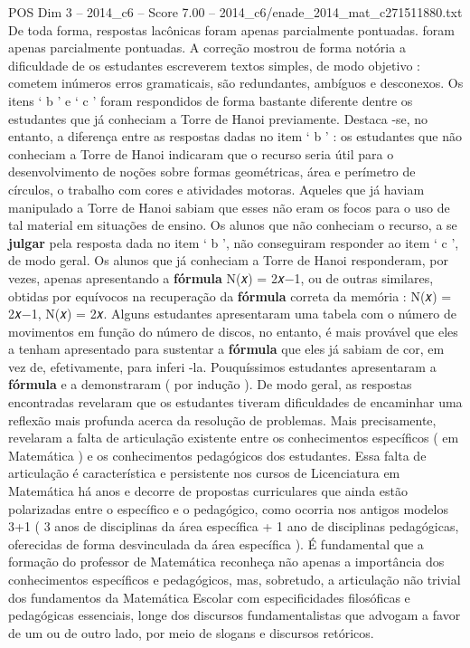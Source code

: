 \begin{textsample}{POS Dim 3 – 2014\_c6 – Score 7.00 – 2014\_c6/enade\_2014\_mat\_c271511880.txt}
De toda forma, respostas lacônicas foram apenas parcialmente pontuadas. foram apenas parcialmente pontuadas.
A correção mostrou de forma notória a dificuldade de os estudantes escreverem textos simples, de modo objetivo : cometem inúmeros erros gramaticais, são redundantes, ambíguos e desconexos.
Os itens ‘ b ’ e ‘ c ’ foram respondidos de forma bastante diferente dentre os estudantes que já conheciam a Torre de Hanoi previamente.
Destaca -se, no entanto, a diferença entre as respostas dadas no item ‘ b ’ : os estudantes que não conheciam a Torre de Hanoi indicaram que o recurso seria útil para o desenvolvimento de noções sobre formas geométricas, área e perímetro de círculos, o trabalho com cores e atividades motoras.
Aqueles que já haviam manipulado a Torre de Hanoi sabiam que esses não eram os focos para o uso de tal material em situações de ensino.
Os alunos que não conheciam o recurso, a se \textbf{julgar} pela resposta dada no item ‘ b ’, não conseguiram responder ao item ‘ c ’, de modo geral.
Os alunos que já conheciam a Torre de Hanoi responderam, por vezes, apenas apresentando a \textbf{fórmula} N(𝑥) = 2𝑥−1, ou de outras similares, obtidas por equívocos na recuperação da \textbf{fórmula} correta da memória : N(𝑥) = 2𝑥−1, N(𝑥) = 2𝑥.
Alguns estudantes apresentaram uma tabela com o número de movimentos em função do número de discos, no entanto, é mais provável que eles a tenham apresentado para sustentar a \textbf{fórmula} que eles já sabiam de cor, em vez de, efetivamente, para inferi -la.
Pouquíssimos estudantes apresentaram a \textbf{fórmula} e a demonstraram ( por indução ).
De modo geral, as respostas encontradas revelaram que os estudantes tiveram dificuldades de encaminhar uma reflexão mais profunda acerca da resolução de problemas.
Mais precisamente, revelaram a falta de articulação existente entre os conhecimentos específicos ( em Matemática ) e os conhecimentos pedagógicos dos estudantes.
Essa falta de articulação é característica e persistente nos cursos de Licenciatura em Matemática há anos e decorre de propostas curriculares que ainda estão polarizadas entre o específico e o pedagógico, como ocorria nos antigos modelos 3+1 ( 3 anos de disciplinas da área específica + 1 ano de disciplinas pedagógicas, oferecidas de forma desvinculada da área específica ).
É fundamental que a formação do professor de Matemática reconheça não apenas a importância dos conhecimentos específicos e pedagógicos, mas, sobretudo, a articulação não trivial dos fundamentos da Matemática Escolar com especificidades filosóficas e pedagógicas essenciais, longe dos discursos fundamentalistas que advogam a favor de um ou de outro lado, por meio de slogans e discursos retóricos.

\end{textsample}
